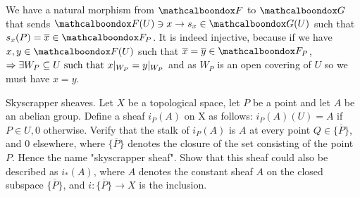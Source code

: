 \begin{sol}
\begin{enumerate}[label=\alph*)]
		We have a natural morphism from $\sF$ to $\sG$ that sends $\sF(U) \ni x \to s_x \in \sG(U)$ such that $s_x(P) = \overline{x} \in \sF_P$. It is indeed injective, because if we have $x,y \in \sF(U)$ such that $\overline{x} = \overline{y} \in \sF_P$, $\Rightarrow \exists W_P \subseteq U \text{ such that } x|_{W_P} = y|_{W_P}$ and as $W_P$ is an open covering of $U$ so we must have $x = y$.
	\end{enumerate}
\end{sol}

\begin{ex}
	Skyscrapper sheaves. Let $X$ be a topological space, let $P$ be a point and let $A$ be an abelian group. Define a sheaf $i_P(A)$ on X as follows: $i_P(A)(U) = A$ if $P \in U, 0$ otherwise. Verify that the stalk of $i_P(A)$ is $A$ at every point $Q \in \overline{\{P\}}$, and 0 elsewhere, where $\overline{\{P\}}$ denotes the closure of the set consisting of the point $P$. Hence the name "skyscrapper sheaf". Show that this sheaf could also be described as $i_{*}(A)$, where $A$ denotes the constant sheaf $A$ on the closed subspace $\overline{\{P\}}$, and $i: \overline{\{P\}} \to X$ is the inclusion.
\end{ex}

